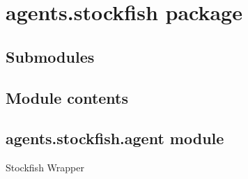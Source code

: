 \documentclass[letterpaper,10pt,english]{sphinxmanual}
\begin{document}
\section{agents.stockfish package}
\label{\detokenize{agents.stockfish:agents-stockfish-package}}\label{\detokenize{agents.stockfish::doc}}

\subsection{Submodules}
\label{\detokenize{agents.stockfish:submodules}}

\subsection{Module contents}
\label{\detokenize{agents.stockfish:module-contents}}\label{\detokenize{agents.stockfish:module-agents.stockfish}}

\subsection{agents.stockfish.agent module}
\label{\detokenize{agents.stockfish:module-agents.stockfish.agent}}\label{\detokenize{agents.stockfish:agents-stockfish-agent-module}}
Stockfish Wrapper
\end{document}
